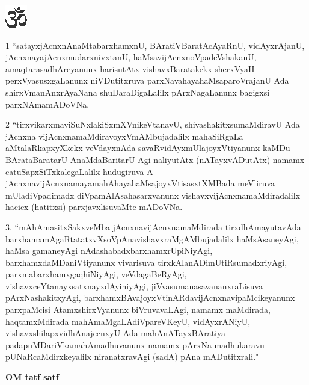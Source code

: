 \thispagestyle{empty}

\begin{center}
{\includegraphics[scale=1.5]{om.eps}}
\end{center}

1 ``satayxjAcnxnAnaMtabarxhamxnU, BAratiVBaratAcAyaRnU, vidAyxrAjanU, jAcnxnayajAcnxmudarxnivxtanU, haMsavijAcnxnoVpadeVshakanU, amaqtarasadhAreyanunx harisutAtx vishavxBaratakekx  sherxVyaH-perxVyasusxgaLanunx niVDutitxruva parxNavahayahaMsaparoVrajanU Ada shirxVmanAnxrAyaNana shuDaraDigaLalilx pArxNagaLanunx bagigxsi parxNAmamADoVNa.

2 ``tirxvikarxmaviSuNxlakiSxmXVnikeVtanavU, shivashakitxsumaMdiravU Ada jAcnxna vijAcnxnamaMdiravoyxVmAMbujadalilx mahaSiRgaLa aMtalaRkapxyXkekx veVdayxnAda savaRvidAyxmUlajoyxVtiyanunx kaMDu BArataBaratarU AnaMdaBaritarU Agi naliyutAtx (nATayxvADutAtx) namamx catuSapxSiTxkalegaLalilx hudugiruva A jAcnxnavijAcnxnamayamahAhayahaMsajoyxVtisasxtXMBada meVliruva mUladiVpadimadx diVpamAlAsahasarxvanunx vishavxvijAcnxnamaMdiradalilx hacicx (hatitxsi) parxjavxlisuvaMte mADoVNa.

3. ``mAhAmasitxSakxveMba jAcnxnavijAcnxnamaMdirada tirxdhAmayutavAda barxhamxmAgaRtatatxvXsoVpAnavishavxraMgAMbujadalilx haMsAsaneyAgi, haMsa gamaneyAgi nAdashabadxbarxhamxrUpiNiyAgi, barxhamxdaMDaniVtiyanunx vivarisuva tirxkAlanADimUtiRsumadxriyAgi, parxmabarxhamxgaqhiNiyAgi, veVdagaBeRyAgi, vishavxceYtanayxsatxnayxdAyiniyAgi, jiVvasumanasavananxraLisuva pArxNashakitxyAgi, barxhamxBAvajoyxVtinARdavijAcnxnavipaMcikeyanunx parxpaMcisi AtamxshirxVyanunx biVruvavaLAgi, namamx maMdirada, haqtamxMdirada mahAmaMgaLAdiVpareVKeyU, vidAyxrANiyU, vishavxshilapxvidhAnajecnxyU Ada mahAnATayxBAratiya padapuMDariVkamahAmadhuvanunx namamx pArxNa madhukaravu pUNaRcaMdirxkeyalilx niranatxravAgi (sadA) pAna mADutitxrali."

\vskip 20pt
\centerline{{\bf OM tatf satf}}
